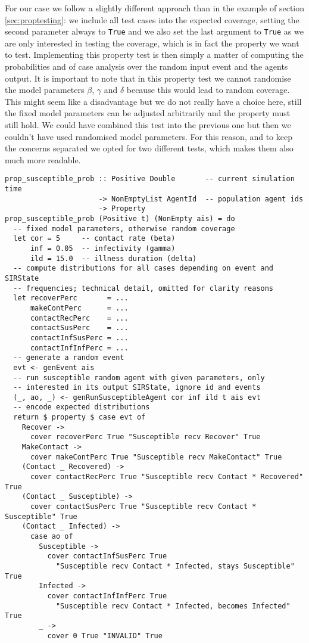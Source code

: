 For our case we follow a slightly different approach than in the example of section \ref{sec:proptesting}: we include all test cases into the expected coverage, setting the second parameter always to \texttt{True} and we also set the last argument to \texttt{True} as we are only interested in testing the coverage, which is in fact the property we want to test. Implementing this property test is then simply a matter of computing the probabilities and of case analysis over the random input event and the agents output. It is important to note that in this property test we cannot randomise the model parameters $\beta$, $\gamma$ and $\delta$ because this would lead to random coverage. This might seem like a disadvantage but we do not really have a choice here, still the fixed model parameters can be adjusted arbitrarily and the property must still hold. We could have combined this test into the previous one but then we couldn't have used randomised model parameters. For this reason, and to keep the concerns separated we opted for two different tests, which makes them also much more readable. 

\begin{footnotesize}
\begin{verbatim}
prop_susceptible_prob :: Positive Double       -- current simulation time
                      -> NonEmptyList AgentId  -- population agent ids 
                      -> Property
prop_susceptible_prob (Positive t) (NonEmpty ais) = do
  -- fixed model parameters, otherwise random coverage
  let cor = 5     -- contact rate (beta)
      inf = 0.05  -- infectivity (gamma)
      ild = 15.0  -- illness duration (delta)
  -- compute distributions for all cases depending on event and SIRState
  -- frequencies; technical detail, omitted for clarity reasons
  let recoverPerc       = ...
      makeContPerc      = ...
      contactRecPerc    = ...
      contactSusPerc    = ...
      contactInfSusPerc = ...
      contactInfInfPerc = ...
  -- generate a random event
  evt <- genEvent ais
  -- run susceptible random agent with given parameters, only
  -- interested in its output SIRState, ignore id and events
  (_, ao, _) <- genRunSusceptibleAgent cor inf ild t ais evt
  -- encode expected distributions
  return $ property $ case evt of 
    Recover -> 
      cover recoverPerc True "Susceptible recv Recover" True
    MakeContact -> 
      cover makeContPerc True "Susceptible recv MakeContact" True
    (Contact _ Recovered) -> 
      cover contactRecPerc True "Susceptible recv Contact * Recovered" True
    (Contact _ Susceptible) -> 
      cover contactSusPerc True "Susceptible recv Contact * Susceptible" True
    (Contact _ Infected) -> 
      case ao of
        Susceptible ->
          cover contactInfSusPerc True 
            "Susceptible recv Contact * Infected, stays Susceptible" True
        Infected ->
          cover contactInfInfPerc True 
            "Susceptible recv Contact * Infected, becomes Infected" True
        _ ->
          cover 0 True "INVALID" True
\end{verbatim}
\end{footnotesize}

